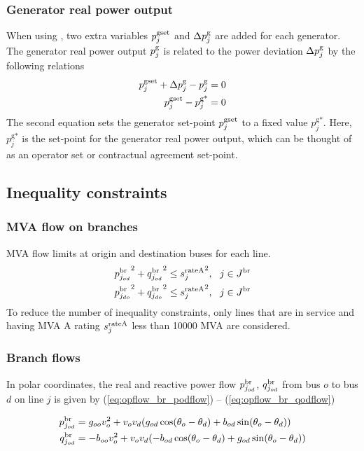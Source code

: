 \subsubsection{Generator real power output}

When using \option{\opflowgensetpoint}, two extra variables $p^{\text{gset}}_j$ and $\Delta{p}^\text{g}_j$ are added for each generator. The generator real power output $p^\text{g}_j$ is related to the power deviation $\Delta{p}^\text{g}_j$ by the following relations
\begin{align}
  p^{\text{gset}}_j + \Delta{p}^\text{g}_j - p^\text{g}_j = 0 \\
  p^{\text{gset}}_j - p^{\text{g*}}_j = 0
\end{align}
The second equation sets the generator set-point $p^{\text{gset}}_j$ to a fixed value $p^{\text{g*}}_j$. Here, $p^{\text{g*}}_j$ is the set-point for the generator real power output, which can be thought of as an operator set or contractual agreement set-point.

\subsection{Inequality constraints}

\subsubsection{MVA flow on branches}
MVA flow limits at origin and destination buses for each line.
\begin{align}
  {p^\text{br}_{j_{od}}}^2 + {q^\text{br}_{j_{od}}}^2 \le {s^{\text{rateA}}_j}^2,~~j \in J^\text{br}\\
  {p^\text{br}_{j_{do}}}^2 + {q^\text{br}_{j_{do}}}^2 \le {s^{\text{rateA}}_j}^2,~~j \in J^\text{br}
\end{align}
To reduce the number of inequality constraints, only lines that are in service and having MVA A rating $s^{\text{rateA}}_j$ less than 10000 MVA are considered.

\subsubsection{Branch flows}
In polar coordinates, the real and reactive power flow $p^\text{br}_{j_{od}}$, $q^\text{br}_{j_{od}}$  from bus $o$ to bus $d$ on line $j$ is given by (\ref{eq:opflow_br_podflow}) -- 
 (\ref{eq:opflow_br_qodflow})


\begin{align}
p^\text{br}_{j_{od}} &= g_{oo}{v^2_o} + v_ov_d(g_{od}\cos(\theta_o - \theta_d) + b_{od}\sin(\theta_o - \theta_d)) \label{eq:opflow_br_podflow}\\
q^\text{br}_{j_{od}} &= -b_{oo}{v^2_o} + v_ov_d(-b_{od}\cos(\theta_o - \theta_d) + g_{od}\sin(\theta_o - \theta_d)) \label{eq:opflow_br_qodflow}
\end{align}

